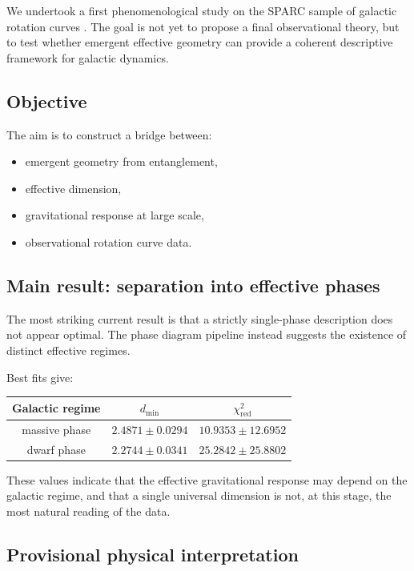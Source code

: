 \documentclass[11pt]{article}
\begin{document}
We undertook a first phenomenological study on the SPARC sample of
galactic rotation curves \cite{sparc}. The goal is not yet to propose
a final observational theory, but to test whether emergent effective
geometry can provide a coherent descriptive framework for galactic
dynamics.

\subsection{Objective}

The aim is to construct a bridge between:

\begin{itemize}
\item emergent geometry from entanglement,
\item effective dimension,
\item gravitational response at large scale,
\item observational rotation curve data.
\end{itemize}

\subsection{Main result: separation into effective phases}

The most striking current result is that a strictly single-phase
description does not appear optimal. The phase diagram pipeline
instead suggests the existence of distinct effective regimes.

Best fits give:

\begin{center}
\begin{tabular}{ccc}
\toprule
Galactic regime & $d_{\min}$ & $\chi^2_{\mathrm{red}}$ \\
\midrule
massive phase & $2.4871 \pm 0.0294$ & $10.9353 \pm 12.6952$ \\
dwarf phase   & $2.2744 \pm 0.0341$ & $25.2842 \pm 25.8802$ \\
\bottomrule
\end{tabular}
\end{center}

These values indicate that the effective gravitational response may
depend on the galactic regime, and that a single universal dimension
is not, at this stage, the most natural reading of the data.

\subsection{Provisional physical interpretation}
\end{document}
